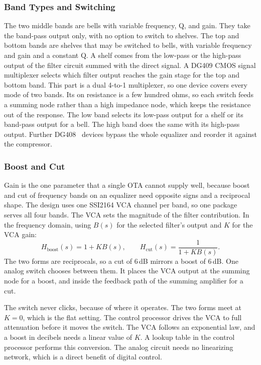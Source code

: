 \documentclass[11pt, letterpaper,titlepage]{article}
\begin{document}
\subsubsection*{Band Types and Switching}
\label{sssec:eq-bands}

The two middle bands are bells with variable frequency, Q, and gain. They take
the band-pass output only, with no option to switch to shelves. The top and bottom bands are shelves that may be switched to bells, with variable
frequency and gain and a constant Q. A shelf comes from the low-pass or the
high-pass output of the filter circuit summed with the direct signal. A DG409 CMOS signal multiplexer selects which filter output reaches the gain stage for the top and bottom band. This part is a dual
4-to-1 multiplexer, so one device covers every mode of two bands. Its on
resistance is a few hundred ohms, so each switch feeds a summing node rather
than a high impedance node, which keeps the resistance out of the response. The low band selects its low-pass output for a shelf or its band-pass
output for a bell. The high band does the same with its high-pass output. Further DG408~\cite{dg409} devices bypass the whole
equalizer and reorder it against the compressor.

\subsubsection*{Boost and Cut}
\label{sssec:eq-gain}

Gain is the one parameter that a single OTA cannot supply well, because boost
and cut of frequency bands on an equalizer need opposite signs and a reciprocal shape. The design uses one SSI2164
VCA channel per band, so one package serves all four bands. The VCA sets the
magnitude of the filter contribution. In the frequency domain, using $B(s)$ for the selected filter's
output and $K$ for the VCA gain:
%
\begin{equation}
    H_\mathrm{boost}(s) = 1 + K B(s) ,
    \qquad
    H_\mathrm{cut}(s) = \frac{1}{1 + K B(s)} .
    \label{eq:eq-gain}
\end{equation}
%
The two forms are reciprocals, so a cut of 6\,dB mirrors a boost of 6\,dB. One
analog switch chooses between them. It places the VCA output at the summing node
for a boost, and inside the feedback path of the summing amplifier for a cut.

The switch never clicks, because of where it operates. The two forms meet at
$K = 0$, which is the flat setting. The control processor drives the VCA to full
attenuation before it moves the switch. 
The VCA follows an exponential law, and a boost in decibels needs a linear value
of $K$. A lookup table in the control processor performs this conversion. The
analog circuit needs no linearizing network, which is a direct benefit of
digital control.
\end{document}
